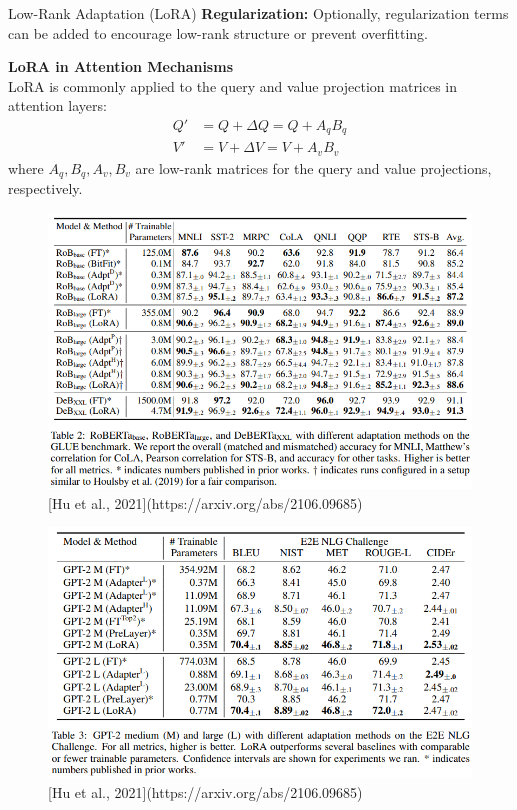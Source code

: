 \begin{frame}[allowframebreaks]{Low-Rank Adaptation (LoRA)}
\textbf{Regularization:} Optionally, regularization terms can be added to encourage low-rank structure or prevent overfitting.

\framebreak
\large \textbf{LoRA in Attention Mechanisms}\\[0.5ex]
LoRA is commonly applied to the query and value projection matrices in attention layers:
\begin{align}
    Q' &= Q + \Delta Q = Q + A_q B_q \\
    V' &= V + \Delta V = V + A_v B_v
\end{align}
where $A_q, B_q, A_v, B_v$ are low-rank matrices for the query and value projections, respectively.

\framebreak

\begin{figure}
    \centering
    \includegraphics[width=\linewidth,height=0.8\textheight,keepaspectratio]{images/adv-img-gen/lora-3.png} \\
    \small [Hu et al., 2021](https://arxiv.org/abs/2106.09685)
\end{figure}

\framebreak

\begin{figure}
    \centering
    \includegraphics[width=\linewidth,height=\textheight,keepaspectratio]{images/adv-img-gen/lora-4.png} \\
    \small [Hu et al., 2021](https://arxiv.org/abs/2106.09685)
\end{figure}
\framebreak


\end{frame}
